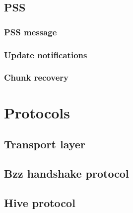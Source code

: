 \section{PSS \statusyellow}

\subsection{PSS message\statusgreen}
\label{spec:format:pss-messsage}

\subsection{Update notifications \statusred}\label{spec:format:update-notifications}
%

\subsection{Chunk recovery  \statusyellow}\label{spec:format:recovery}


\chapter{Protocols}\label{spec:protocol}


\section{Transport layer}\label{speec:protocol:transport}




\section{Bzz handshake protocol \statusgreen}\label{spec:protocol:bzz}


\section{Hive protocol  \statusgreen}\label{spec:protocol:hive}


